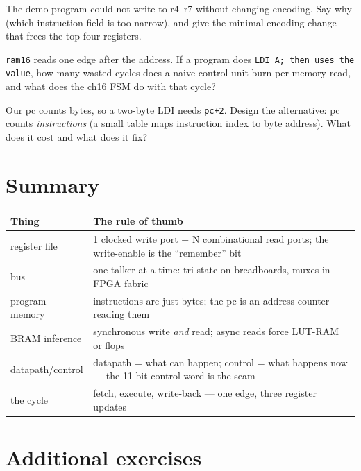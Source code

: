 \begin{exercise}[medium]
The demo program could not write to r4--r7 without changing encoding.
Say why (which instruction field is too narrow), and give the minimal
encoding change that frees the top four registers.
\end{exercise}
\begin{exercise}[medium]
\texttt{ram16} reads one edge after the address. If a program does
\texttt{LDI A; then uses the value}, how many wasted cycles does a
naive control unit burn per memory read, and what does the ch16 FSM
do with that cycle?
\end{exercise}
\begin{exercise}[hard]
Our pc counts bytes, so a two-byte LDI needs \texttt{pc+2}. Design
the alternative: pc counts \emph{instructions} (a small table maps
instruction index to byte address). What does it cost and what does
it fix?
\end{exercise}

\section{Summary}\label{sec:sum15}

\begin{center}
\begin{tabularx}{\linewidth}{@{}lX@{}}
\toprule
\textbf{Thing} & \textbf{The rule of thumb}\\
\midrule
register file & 1 clocked write port + N combinational read ports;
the write-enable is the ``remember'' bit\\
bus & one talker at a time: tri-state on breadboards, muxes in FPGA
fabric\\
program memory & instructions are just bytes; the pc is an address
counter reading them\\
BRAM inference & synchronous write \emph{and} read; async reads force
LUT-RAM or flops\\
datapath/control & datapath = what can happen; control = what happens
now --- the 11-bit control word is the seam\\
the cycle & fetch, execute, write-back --- one edge, three register
updates\\
\bottomrule
\end{tabularx}
\end{center}

\section*{Additional exercises}

